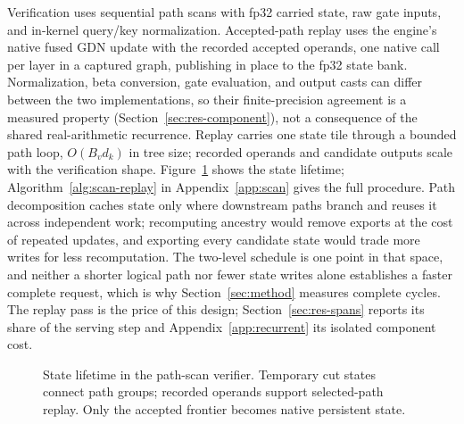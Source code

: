 \documentclass[sigconf,anonymous,review]{acmart}
\begin{document}
Verification uses sequential path scans with fp32 carried state, raw gate inputs, and in-kernel query/key normalization. Accepted-path replay uses the engine's native fused GDN update with the recorded accepted operands, one native call per layer in a captured graph, publishing in place to the fp32 state bank. Normalization, beta conversion, gate evaluation, and output casts can differ between the two implementations, so their finite-precision agreement is a measured property (Section~\ref{sec:res-component}), not a consequence of the shared real-arithmetic recurrence. Replay carries one state tile through a bounded path loop, $O(B_vd_k)$ in tree size; recorded operands and candidate outputs scale with the verification shape. Figure~\ref{fig:scan-replay} shows the state lifetime; Algorithm~\ref{alg:scan-replay} in Appendix~\ref{app:scan} gives the full procedure. Path decomposition caches state only where downstream paths branch and reuses it across independent work; recomputing ancestry would remove exports at the cost of repeated updates, and exporting every candidate state would trade more writes for less recomputation. The two-level schedule is one point in that space, and neither a shorter logical path nor fewer state writes alone establishes a faster complete request, which is why Section~\ref{sec:method} measures complete cycles. The replay pass is the price of this design; Section~\ref{sec:res-spans} reports its share of the serving step and Appendix~\ref{app:recurrent} its isolated component cost.

\begin{figure}[t]
\centering

\caption{State lifetime in the path-scan verifier. Temporary cut states connect path groups; recorded operands support selected-path replay. Only the accepted frontier becomes native persistent state.}
\label{fig:scan-replay}
\end{figure}
\end{document}
